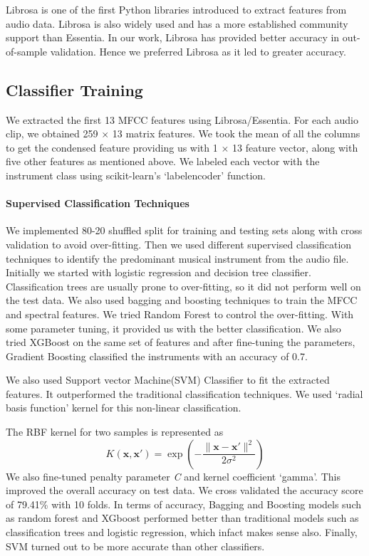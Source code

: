 \documentclass[conference]{IEEEtran}
\begin{document}
Librosa is one of the first Python libraries introduced to extract features from audio data. Librosa is also widely used and has a more established community support than Essentia. In our work, Librosa has provided better accuracy in out-of-sample validation. Hence we preferred Librosa as it led to greater accuracy.

\subsection{Classifier Training}

We extracted the first 13 MFCC features using Librosa/Essentia. For each audio clip, we obtained 259 $\times$ 13 matrix features. We took the mean of all the columns to get the condensed feature providing us with 1 $\times$ 13 feature vector, along with five other features as mentioned above. We labeled each vector with the instrument class using scikit-learn's `labelencoder' function.

\paragraph{Supervised Classification Techniques}

We implemented  80-20 shuffled split for training and testing sets along with cross validation to avoid over-fitting. Then we used different supervised classification techniques to identify the predominant musical instrument from the audio file. Initially we started with logistic regression and decision tree classifier. Classification trees are usually prone to over-fitting, so it did not perform well on the test data. We also used bagging and boosting techniques to train the MFCC and spectral features. We tried Random Forest to control the over-fitting. With some parameter tuning, it provided us with the better classification. We also tried XGBoost on the same set of features and after fine-tuning the parameters, Gradient Boosting classified the instruments with an accuracy of 0.7. 

We also used Support vector Machine(SVM) Classifier to fit the extracted features. It outperformed the traditional classification techniques. We used `radial basis function' kernel for this non-linear classification. 

The RBF kernel for two samples is represented as $${\displaystyle K(\mathbf {x} ,\mathbf {x'} )=\exp \left(-{\frac {\|\mathbf {x} -\mathbf {x'} \|^{2}}{2\sigma ^{2}}}\right)}$$
We also fine-tuned penalty parameter \textit{C} and kernel coefficient `gamma'. This improved the overall accuracy on test data. We cross validated the accuracy score of 79.41\% with 10 folds. In terms of accuracy, Bagging and Boosting models such as random forest and XGboost performed better than traditional models such as classification trees and logistic regression, which infact makes sense also. Finally, SVM turned out to be more accurate than other classifiers.
\end{document}
